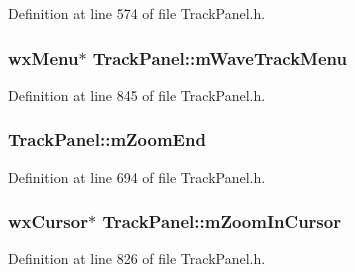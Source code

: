 Definition at line 574 of file Track\+Panel.\+h.

\subsubsection[{\texorpdfstring{m\+Wave\+Track\+Menu}{mWaveTrackMenu}}]{\setlength{\rightskip}{0pt plus 5cm}wx\+Menu$\ast$ Track\+Panel\+::m\+Wave\+Track\+Menu\hspace{0.3cm}{\ttfamily [protected]}}\hypertarget{class_track_panel_a7ff1b9a82a327967fb6f0ac60fd93016}{}\label{class_track_panel_a7ff1b9a82a327967fb6f0ac60fd93016}


Definition at line 845 of file Track\+Panel.\+h.

\subsubsection[{\texorpdfstring{m\+Zoom\+End}{mZoomEnd}}]{ Track\+Panel\+::m\+Zoom\+End\hspace{0.3cm}{\ttfamily [protected]}}\hypertarget{class_track_panel_abd83a1e090f84770b6978fa7c56e6567}{}\label{class_track_panel_abd83a1e090f84770b6978fa7c56e6567}


Definition at line 694 of file Track\+Panel.\+h.

\subsubsection[{\texorpdfstring{m\+Zoom\+In\+Cursor}{mZoomInCursor}}]{\setlength{\rightskip}{0pt plus 5cm}wx\+Cursor$\ast$ Track\+Panel\+::m\+Zoom\+In\+Cursor\hspace{0.3cm}{\ttfamily [protected]}}\hypertarget{class_track_panel_a48bdb309d319ab126fc86691a86ca9bc}{}\label{class_track_panel_a48bdb309d319ab126fc86691a86ca9bc}


Definition at line 826 of file Track\+Panel.\+h.

